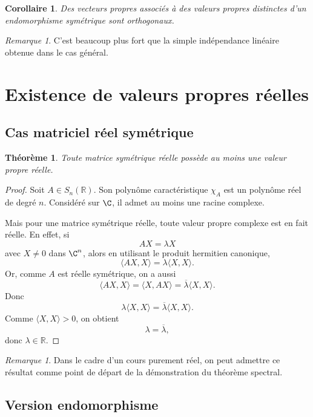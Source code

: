\documentclass[11pt,a4paper]{article}
\newtheorem{theoreme}[definition]{Théorème}
\newtheorem{corollaire}[definition]{Corollaire}
\theoremstyle{remark}
\newtheorem{remarque}[definition]{Remarque}
\newcommand{\R}{\mathbb{R}}
\begin{document}
\begin{corollaire}
Des vecteurs propres associés à des valeurs propres distinctes d’un endomorphisme symétrique sont orthogonaux.
\end{corollaire}

\begin{remarque}
C’est beaucoup plus fort que la simple indépendance linéaire obtenue dans le cas général.
\end{remarque}

\section{Existence de valeurs propres réelles}

\subsection{Cas matriciel réel symétrique}

\begin{theoreme}
Toute matrice symétrique réelle possède au moins une valeur propre réelle.
\end{theoreme}

\begin{proof}
Soit \(A\in S_n(\R)\). Son polynôme caractéristique \(\chi_A\) est un polynôme réel de degré \(n\). Considéré sur \(\C\), il admet au moins une racine complexe.

Mais pour une matrice symétrique réelle, toute valeur propre complexe est en fait réelle. En effet, si
\[
AX=\lambda X
\]
avec \(X\neq 0\) dans \(\C^n\), alors en utilisant le produit hermitien canonique,
\[
\langle AX,X\rangle = \lambda \langle X,X\rangle.
\]
Or, comme \(A\) est réelle symétrique, on a aussi
\[
\langle AX,X\rangle = \langle X,AX\rangle = \overline{\lambda}\langle X,X\rangle.
\]
Donc
\[
\lambda \langle X,X\rangle = \overline{\lambda}\langle X,X\rangle.
\]
Comme \(\langle X,X\rangle>0\), on obtient
\[
\lambda=\overline{\lambda},
\]
donc \(\lambda\in\R\).
\end{proof}

\begin{remarque}
Dans le cadre d’un cours purement réel, on peut admettre ce résultat comme point de départ de la démonstration du théorème spectral.
\end{remarque}

\subsection{Version endomorphisme}
\end{document}
